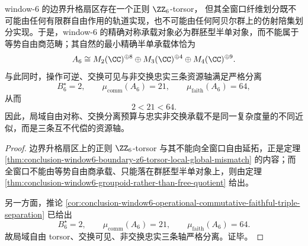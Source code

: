\begin{theorem}\label{thm:conclusion-window6-local-torsor-global-groupoid-three-resource-split}
window-\(6\) 的边界升格扇区存在一个正则 \(\ZZ_6\)-torsor，
但其全窗口纤维划分既不可能由任何有限群自由作用的轨道实现，也不可能由任何阿贝尔群上的仿射陪集划分实现。于是，window-\(6\) 的精确对称承载对象必为群胚型半单对象，而不能属于等势自由商范畴；其自然的最小精确半单承载体恰为
\[
A_6\cong M_2(\CC)^{\oplus 8}\oplus M_3(\CC)^{\oplus 4}\oplus M_4(\CC)^{\oplus 9}.
\]
与此同时，操作可逆、交换可见与非交换忠实三条资源轴满足严格分离
\[
B_6^\star=2,
\qquad
\mu_{\mathrm{comm}}(A_6)=21,
\qquad
\mu_{\mathrm{faith}}(A_6)=64,
\]
从而
\[
2<21<64.
\]
因此，局域自由对称、交换分离预算与忠实非交换承载不是同一复杂度量的不同近似，而是三条互不代偿的资源轴。
\end{theorem}
\begin{proof}
边界升格扇区上的正则 \(\ZZ_6\)-torsor 与其不能向全窗口自由延拓，正是定理 \ref{thm:conclusion-window6-boundary-z6-torsor-local-global-mismatch} 的内容；而全窗口不能由等势自由商承载、只能落在群胚型半单对象上，则由定理 \ref{thm:conclusion-window6-groupoid-rather-than-free-quotient} 给出。

另一方面，推论 \ref{cor:conclusion-window6-operational-commutative-faithful-triple-separation} 已给出
\[
B_6^\star=2,\qquad \mu_{\mathrm{comm}}(A_6)=21,\qquad \mu_{\mathrm{faith}}(A_6)=64.
\]
故局域自由 torsor、交换可见、非交换忠实三条轴严格分离。证毕。
\end{proof}

